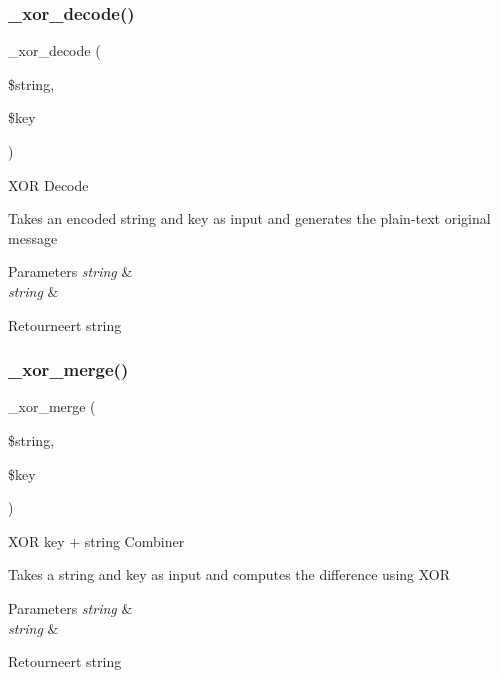 \subsubsection{\texorpdfstring{\_xor\_decode()}{\_xor\_decode()}}
{\footnotesize\ttfamily \+\_\+xor\+\_\+decode (\begin{DoxyParamCaption}\item[{}]{\$string,  }\item[{}]{\$key }\end{DoxyParamCaption})\hspace{0.3cm}{\ttfamily [protected]}}

X\+OR Decode

Takes an encoded string and key as input and generates the plain-\/text original message


\begin{DoxyParams}{Parameters}
{\em string} & \\
\hline
{\em string} & \\
\hline
\end{DoxyParams}
\begin{DoxyReturn}{Retourneert}
string 
\end{DoxyReturn}
\mbox{\label{class_c_i___encrypt_aaf2644aeb5ec418eb4ddc2d70f372ada}} 
\subsubsection{\texorpdfstring{\_xor\_merge()}{\_xor\_merge()}}
{\footnotesize\ttfamily \+\_\+xor\+\_\+merge (\begin{DoxyParamCaption}\item[{}]{\$string,  }\item[{}]{\$key }\end{DoxyParamCaption})\hspace{0.3cm}{\ttfamily [protected]}}

X\+OR key + string Combiner

Takes a string and key as input and computes the difference using X\+OR


\begin{DoxyParams}{Parameters}
{\em string} & \\
\hline
{\em string} & \\
\hline
\end{DoxyParams}
\begin{DoxyReturn}{Retourneert}
string 
\end{DoxyReturn}
\mbox{\label{class_c_i___encrypt_a54562258204ebec3d699eed228c51199}} 
